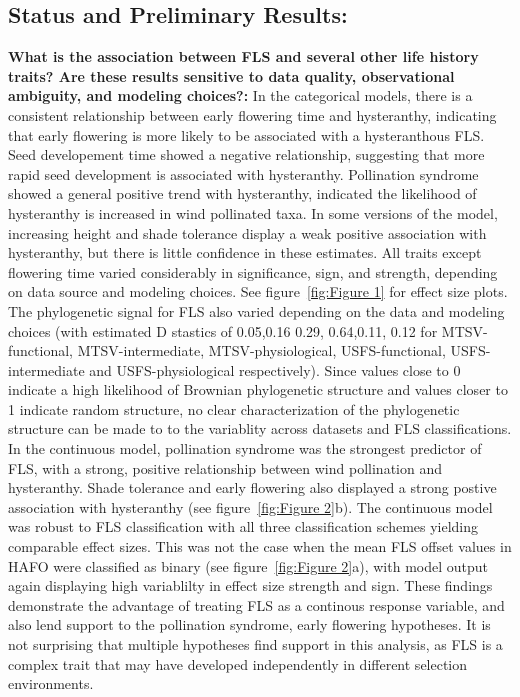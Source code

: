 \documentclass[12pt]{article}\usepackage[]{graphicx}\usepackage[]{color}
\begin{document}
\subsection*{Status and Preliminary Results:}
\indent\indent\textbf{What is the association between FLS and several other life history traits?  Are these results sensitive to data quality, observational ambiguity, and modeling choices?:} In the categorical models, there is a consistent relationship between early flowering time and hysteranthy, indicating that early flowering is more likely to be associated with a hysteranthous FLS. Seed developement time showed a negative relationship, suggesting that more rapid seed development is associated with hysteranthy. Pollination syndrome showed a general positive trend with hysteranthy, indicated the likelihood of hysteranthy is increased in wind pollinated taxa. In some versions of the model, increasing height and shade tolerance display a weak positive association with hysteranthy, but there is little confidence in these estimates. All traits except flowering time varied considerably in significance, sign, and strength, depending on data source and modeling choices. See figure~\ref{fig:Figure 1} for effect size plots.\\
\indent The phylogenetic signal for FLS also varied depending on the data and modeling choices (with estimated D stastics of 0.05,0.16 0.29, 0.64,0.11, 0.12 for MTSV-functional, MTSV-intermediate, MTSV-physiological, USFS-functional, USFS-intermediate and USFS-physiological respectively). Since values close to 0 indicate a high likelihood of Brownian phylogenetic structure and values closer to 1 indicate random structure, no clear characterization of the phylogenetic structure can be made to to the variablity across datasets and FLS classifications. \\
\indent In the continuous model, pollination syndrome was the strongest predictor of FLS, with a strong, positive relationship between wind pollination and hysteranthy. Shade tolerance and early flowering also displayed a strong postive association with hysteranthy (see figure~\ref{fig:Figure 2}b). The continuous model was robust to FLS classification with all three classification schemes yielding comparable effect sizes. This was not the case when the mean FLS offset values in HAFO were classified as binary (see figure~\ref{fig:Figure 2}a), with model output again displaying high variablilty in effect size strength and sign. These findings demonstrate the advantage of treating FLS as a continous response variable, and also lend support to the pollination syndrome, early flowering hypotheses. It is not surprising that multiple hypotheses find support in this analysis, as FLS is a complex trait that may have developed independently in different selection environments.
\end{document}
